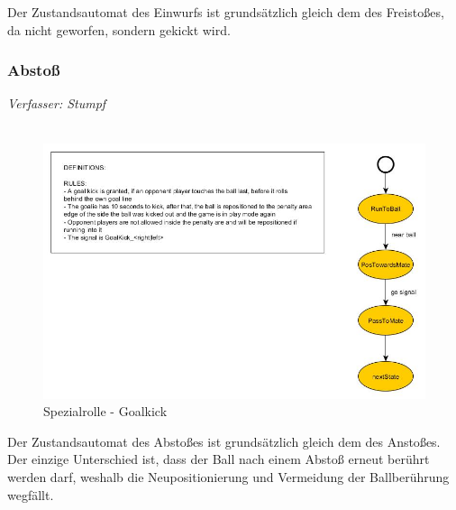 \documentclass[fontsize=12pt,a4paper,final]{scrartcl}[2003/01/01]
\begin{document}
Der Zustandsautomat des Einwurfs ist grundsätzlich gleich dem des Freisto{\ss}es, da nicht geworfen, sondern gekickt wird.

\subsubsection{Absto{\ss}}
\textit{Verfasser: Stumpf}\\
\\
\begin{figure}[H]
	\centering
	\includegraphics[width=\textwidth]{Grafiken/KI/Standardsituationen/GoalKickSM}
	\caption{Spezialrolle - Goalkick}
	\label{fig:Standard - Goalkick}
\end{figure}

Der Zustandsautomat des Absto{\ss}es ist grundsätzlich gleich dem des Ansto{\ss}es. Der einzige Unterschied ist, dass der Ball nach einem Abstoß erneut berührt werden darf, weshalb die Neupositionierung und Vermeidung der Ballberührung wegfällt.
\end{document}
